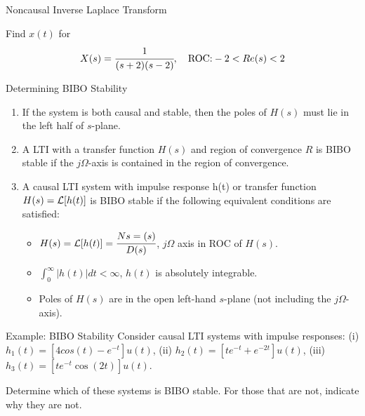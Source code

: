 \documentclass[aspectratio=169,xcolor=dvipsnames,svgnames,x11names,fleqn]{beamer}
\begin{document}
\begin{frame}{}
\vspace*{-9\baselineskip}
    \color{LightGray}{Blank space for calculation}
\end{frame}


\begin{frame}{Noncausal Inverse Laplace Transform}
 \vspace*{-6\baselineskip}

 Find $x(t)$ for 
    \begin{equation*}
        X(s) = \cfrac{1}{(s+2)(s-2)}, \quad \textrm{ROC:} -2 < Re(s) < 2
    \end{equation*}
\end{frame}



\begin{frame}{}
\vspace*{-9\baselineskip}
    \color{LightGray}{Blank space for calculation}
\end{frame}


\begin{frame}{Determining BIBO Stability}
    \begin{enumerate}
        \item If the system is both causal and stable, then the poles of $H(s)$ must lie in the left half of $s$-plane.
        \item A LTI with a transfer function $H (s)$ and region of convergence $R$ is BIBO stable if the $j\Omega$-axis is contained in the region of convergence.
        \item A causal LTI system with impulse response h(t) or transfer function $H (s) = {\mathcal L}[h(t)]$ is BIBO stable if the following equivalent conditions are satisfied:
        \begin{itemize}
            \item $H(s) = {\mathcal L}[h(t)] = \cfrac{Ns=(s)}{D(s)}$, $j\Omega$ axis in ROC of $H(s)$.
            \item $\int_0^\infty |h(t)| dt < \infty $, $h(t)$ is absolutely integrable.
            \item Poles of $H(s)$ are  in the open left-hand  $s$-plane (not including the $j\Omega$-axis).
        \end{itemize}
    \end{enumerate}
\end{frame}

\begin{frame}{Example: BIBO Stability}
Consider causal LTI systems with impulse responses: (i) $ h_1(t) = [4 cos(t) - e^{-t}
]u(t)$, (ii) $h_2(t) = [te^{-t} + e^{-2t}
]u(t)$, (iii) $h_3(t) = [te^{-t} \cos(2t)]u(t)$.

Determine which of these systems is BIBO stable. For those that are not, indicate why they are not.
\end{frame}

\begin{frame}{}
\vspace*{-9\baselineskip}
    \color{LightGray}{Blank space for calculation}
\end{frame}

\begin{frame}{}
\vspace*{-9\baselineskip}
    \color{LightGray}{Blank space for calculation}
\end{frame}
\end{document}
